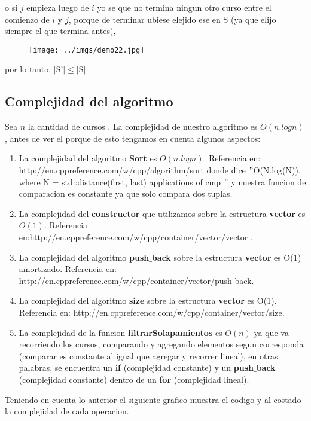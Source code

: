 \begin{itemize}
\begin{itemize}
o si $j$ empieza luego de $i$ yo se que no termina ningun otro curso entre el comienzo de $i$ y $j$, porque de terminar ubiese elejido ese en S  (ya que elijo siempre el que termina antes), 

\begin{figure}[H] %
\begin{center}
\texttt{[image: ../imgs/demo22.jpg]}
\end{center}
\end{figure}

\end{itemize}

por lo tanto, $|$S'$| \leq |$S$|$. 


\subsection{Complejidad del algoritmo}

Sea $n$ la cantidad de cursos . La complejidad de nuestro algoritmo es $O(n.log n)$, antes de ver el porque de esto tengamos en cuenta algunos aspectos:
\begin{enumerate}
\item La complejidad del algoritmo \textbf{Sort} es $O(n.log n)$. Referencia en: http://en.cppreference.com/w/cpp/algorithm/sort donde dice $"$O(N.log(N)), where N = std::distance(first, last) applications of cmp $"$ y nuestra funcion de comparacion es constante ya que solo compara dos tuplas.
\item La complejidad del \textbf{constructor} que utilizamos sobre la estructura \textbf{vector} es $O(1)$. Referencia en:http://en.cppreference.com/w/cpp/container/vector/vector .
\item La complejidad del algoritmo \textbf{push$\_$back} sobre la estructura \textbf{vector} es O(1) amortizado. Referencia en: http://en.cppreference.com/w/cpp/container/vector/push$\_$back. 
\item La complejidad del algoritmo \textbf{size} sobre la estructura \textbf{vector} es O(1). Referencia en: http://en.cppreference.com/w/cpp/container/vector/size.
\item La complejidad de la funcion \textbf{filtrarSolapamientos} es $O(n)$ ya que va recorriendo los cursos, comparando y agregando elementos segun corresponda (comparar es constante al igual que agregar y recorrer lineal), en otras palabras, se encuentra un \textbf{if} (complejidad constante) y un \textbf{push$\_$back} (complejidad constante) dentro de un \textbf{for} (complejidad lineal). 
\end{enumerate}
Teniendo en cuenta lo anterior el siguiente grafico muestra el codigo y al costado la complejidad de cada operacion.


\end{itemize}
